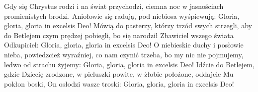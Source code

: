 \beginverse
Gdy się Chrystus rodzi
i na świat przychodzi,
ciemna noc w jasnościach
promienistych brodzi.
Aniołowie się radują,
pod niebiosa wyśpiewują:
Gloria, gloria, gloria
in excelsis Deo!
\endverse
\beginverse
Mówią do pasterzy,
którzy trzód swych strzegli,
aby do Betlejem
czym prędzej pobiegli,
bo się narodził Zbawiciel
wszego świata Odkupiciel:
Gloria, gloria, gloria
in excelsis Deo!
\endverse
\beginverse
O niebieskie duchy
i posłowie nieba,
powiedzcież wyraźniej,
co nam czynić trzeba,
bo my nic nie pojmujemy,
ledwo od strachu żyjemy:
Gloria, gloria, gloria
in excelsis Deo!
\endverse
\beginverse
Idźcie do Betlejem,
gdzie Dziecię zrodzone,
w pieluszki powite,
w żłobie położone,
oddajcie Mu pokłon boski,
On osłodzi wasze troski:
Gloria, gloria, gloria
in excelsis Deo!
\endverse
\endsong